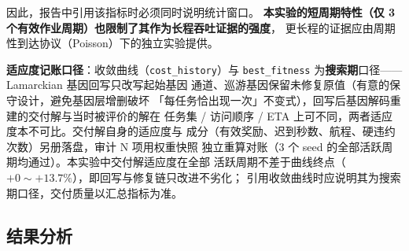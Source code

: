 \documentclass[a4paper,11pt]{article}
\begin{document}
因此，报告中引用该指标时必须同时说明统计窗口。
\textbf{本实验的短周期特性（仅 3 个有效作业周期）也限制了其作为长程吞吐证据的强度}，
更长程的证据应由周期性到达协议（Poisson）下的独立实验提供。

\textbf{适应度记账口径}：收敛曲线（\texttt{cost\_history}）与
\texttt{best\_fitness} 为\textbf{搜索期}口径——Lamarckian 基因回写只改写起始基因
通道、巡游基因保留未修复原值（有意的保守设计，避免基因层增删破坏
「每任务恰出现一次」不变式），回写后基因解码重建的交付解与当时被评价的解在
任务集 / 访问顺序 / ETA 上可不同，两者适应度本不可比。交付解自身的适应度与
成分（有效奖励、迟到秒数、航程、硬违约次数）另册落盘，审计 N 项用权重快照
独立重算对账（3 个 seed 的全部活跃周期均通过）。本实验中交付解适应度在全部
活跃周期不差于曲线终点（$+0\sim+13.7\%$），即回写与修复链只改进不劣化；
引用收敛曲线时应说明其为搜索期口径，交付质量以汇总指标为准。

\subsection{结果分析}
\end{document}
